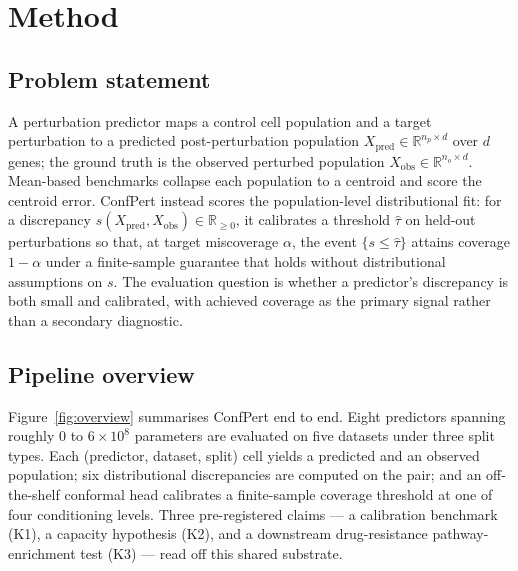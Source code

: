 \documentclass{article}
\begin{document}
\section{Method}

\subsection{Problem statement}
A perturbation predictor maps a control cell population and a target perturbation to a predicted post-perturbation population $X_{\text{pred}} \in \mathbb{R}^{n_p \times d}$ over $d$ genes; the ground truth is the observed perturbed population $X_{\text{obs}} \in \mathbb{R}^{n_o \times d}$. Mean-based benchmarks collapse each population to a centroid and score the centroid error. ConfPert instead scores the population-level distributional fit: for a discrepancy $s(X_{\text{pred}}, X_{\text{obs}}) \in \mathbb{R}_{\geq 0}$, it calibrates a threshold $\hat{\tau}$ on held-out perturbations so that, at target miscoverage $\alpha$, the event $\{s \leq \hat{\tau}\}$ attains coverage $1 - \alpha$ under a finite-sample guarantee that holds without distributional assumptions on $s$. The evaluation question is whether a predictor's discrepancy is both small and calibrated, with achieved coverage as the primary signal rather than a secondary diagnostic.

\subsection{Pipeline overview}
Figure~\ref{fig:overview} summarises ConfPert end to end. Eight predictors spanning roughly $0$ to $6 \times 10^8$ parameters are evaluated on five datasets under three split types. Each (predictor, dataset, split) cell yields a predicted and an observed population; six distributional discrepancies are computed on the pair; and an off-the-shelf conformal head calibrates a finite-sample coverage threshold at one of four conditioning levels. Three pre-registered claims --- a calibration benchmark (K1), a capacity hypothesis (K2), and a downstream drug-resistance pathway-enrichment test (K3) --- read off this shared substrate.
\end{document}
